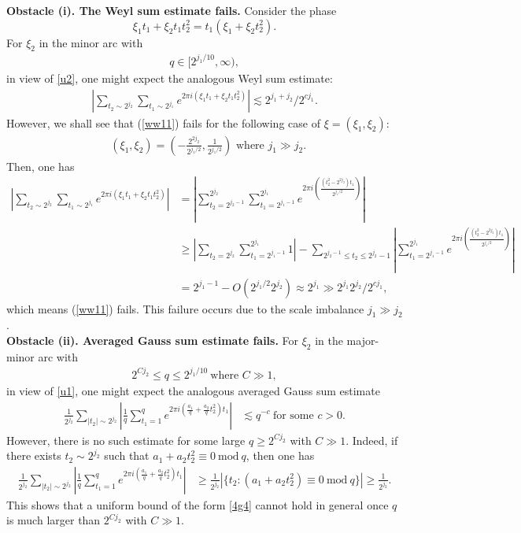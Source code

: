 \documentclass[11 pt,letterpaper]{amsart}
\theoremstyle{plain}
\theoremstyle{definition}
\theoremstyle{remark} \theoremstyle{exam} \theoremstyle{ob}
\numberwithin{equation}{section}
\begin{document}
 

\noindent\textbf{Obstacle (i). The Weyl sum estimate fails.}
Consider the phase
$$\xi_{1} t_1+\xi_{2} t_1t_2^2=t_1(\xi_{1}+\xi_{2}t_2^2).$$
For $\xi_2$ in the minor arc  with  \begin{align}\label{w1}
	q \in [2^{j_1/10},\infty), 
\end{align}in view of \eqref{u2}, one might expect the analogous Weyl sum estimate:
\begin{align}\label{ww11}
	\left|\sum_{t_2\sim 2^{j_2}}\sum_{t_1\sim 2^{j_1}} e^{2\pi  i\left(\xi_{1}t_1+\xi_{2}t_1t_2^2\right)}\right|\lesssim 2^{j_1+j_2}/2^{c j_1}.
\end{align}
However, we shall see that (\ref{ww11}) fails for the following case of $\xi=(\xi_1,\xi_2)$:
\begin{align*} 
	\text{ $(\xi_{1},\xi_2)=(-\frac{2^{2j_2}}{2^{j_1/2}},\frac{1}{2^{j_1/2}}) $ where  }  j_1\gg j_2.
\end{align*}
 Then, one has
\begin{align*}
	\left|\sum_{t_2\sim 2^{j_2}}\sum_{t_1\sim 2^{j_1}} e^{2\pi  i\left(\xi_{1}t_1+\xi_{2}t_1t_2^2\right)}\right|
	&=\left|\sum_{t_2=2^{j_2-1}}^{2^{j_2}}\sum_{t_1=2^{j_1-1}}^{2^{j_1}} e^{2\pi  i\left(\frac{(t_2^2-2^{2j_2})t_1}{2^{j_1/2}}\right)}\right|\\
	&\ge \left|\sum_{t_2=2^{j_2}} \sum_{t_1=2^{j_1-1}}^{2^{j_1}} 1\right|-\sum_{2^{j_2-1}\le t_2\le 2^{j_2}-1}\left|\sum_{t_1=2^{j_1-1}}^{2^{j_1}}  
	e^{2\pi  i\left(\frac{(t_2^2-2^{2j_2})t_1}{2^{j_1/2}}\right)}\right|\\
	&= 2^{j_1-1}-O(2^{j_1/2}2^{j_2})\approx 2^{j_1}\gg 2^{j_1} 2^{j_2}/2^{c j_1},
\end{align*}
which means (\ref{ww11}) fails. This failure  occurs due to the scale imbalance   $j_1\gg j_2$.\\


\noindent\textbf{Obstacle (ii). Averaged Gauss sum estimate  fails.} For $\xi_2$ in the major-minor arc  
 with \begin{align}\label{w2}
 	2^{Cj_2}\le q\le 2^{j_1/10}  \ \text{where $C\gg 1$},
 \end{align}  in view of \eqref{u1}, one might expect the analogous averaged Gauss sum estimate 
 \begin{align}\label{4g4}
 \frac{1}{2^{j_2}} \sum_{|t_2|\sim 2^{j_2}}\left|\frac{1}{q}\sum_{t_1=1}^q e^{2\pi i  (\frac{a_1}{q}+\frac{a_2}{q}t_2^2) t_1}\right| & \lesssim  q^{-c}\ \text{for some $c>0$}.
 \end{align}
However, there is  no    such estimate for some large $q\ge 2^{Cj_2}$  with $C\gg 1$. Indeed, if there exists   $t_2\sim 2^{j_2}$ such that   $a_1+a_2t_2^2\equiv 0\ \text{mod} \ q$, then one has
\begin{align*}
	\frac{1}{2^{j_2}} \sum_{|t_2|\sim 2^{j_2}}\left|\frac{1}{q}\sum_{t_1=1}^q e^{2\pi i  (\frac{a_1}{q}+\frac{a_2}{q}t_2^2) t_1}\right| &\ge \frac{1}{2^{j_2}}\left|\{t_2:  (a_1+a_2t_2^2)\equiv 0\  \text{mod}\ q\}\right| \ge\frac{1}{2^{j_2}}.
\end{align*}
This shows that a uniform bound of the form \eqref{4g4} cannot hold in general once $q$ is much larger than $2^{Cj_2}$ with $C\gg 1$.
\end{document}
